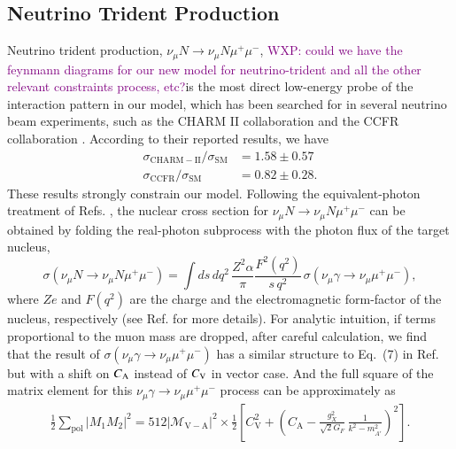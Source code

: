 \documentclass[onecolumn, aps, nofootinbib, prd, preprint, floats, floatfix, amsmath, amssymb, superscriptaddress, preprintnumbers]{revtex4-2}
\newcommand{\WXP}[1]{\textcolor{purple} {WXP: #1}}
\newcommand{\zb}[1]{{\color{blue} {#1}}}
\begin{document}
\subsection{Neutrino Trident Production}
Neutrino trident production, \zb{$\nu_\mu N\to \nu_\mu N\mu^+\mu^-$}, \WXP{could we have the feynmann diagrams for our new model for neutrino-trident and all the other relevant constraints process, etc?}is the most direct low-energy probe of the interaction pattern in our model, which has been searched for in several neutrino beam experiments, such as the CHARM II collaboration \cite{geiregat1990first} and the CCFR collaboration \cite{CCFR:1991lpl}. According to their reported results, we have 
\begin{equation}
\begin{aligned}
\sigma_{\mathrm{CHARM}-\mathrm{II}} / \sigma_{\mathrm{SM}} & =1.58 \pm 0.57 \\
\sigma_{\mathrm{CCFR}} / \sigma_{\mathrm{SM}} & =0.82 \pm 0.28.
\end{aligned}
\end{equation}
These results strongly constrain our model.
Following the equivalent-photon treatment of Refs. \cite{Williams:1934ad,Belusevic:1987cw,Altmannshofer:2014pba}, the nuclear cross section for $\nu_\mu N\to \nu_\mu N\mu^+\mu^-$ can be obtained by folding the real-photon subprocess with the photon flux of the target nucleus,
\begin{equation}
\sigma(\nu_\mu N\to\nu_\mu N\mu^+\mu^-)
=\int ds\,dq^2\,
\frac{Z^2\alpha}{\pi}\frac{F^2(q^2)}{s\,q^2}\,
\sigma(\nu_\mu\gamma\to\nu_\mu\mu^+\mu^-),
\label{eq:trident-epa}
\end{equation}
where $Ze$ and $F(q^2)$ are the charge and the electromagnetic form-factor of the nucleus, respectively (see Ref. \cite{Altmannshofer:2014pba} for more details).
For analytic intuition, if terms proportional to the muon mass are dropped, after careful calculation, we find that the result of $\sigma(\nu_\mu\gamma\to\nu_\mu\mu^+\mu^-)$ has a similar structure to Eq.~(7) in Ref.~\cite{Altmannshofer:2014pba} but with a shift on $C_{\rm A}$ instead of $C_{\rm V}$ in vector case.
And the full square of the matrix element for this $\nu_\mu\gamma\to\nu_\mu\mu^+\mu^-$ process can be approximately as
\begin{equation}
\begin{aligned}
\frac{1}{2} \sum_{\mathrm{pol}}\left|M_1 M_2\right|^2=512\left|\mathcal{M}_{\mathrm{V}-\mathrm{A}}\right|^2 \times \frac{1}{2}\left[C_{\mathrm{V}}^2+\left(C_{\mathrm{A}}-\frac{g_X^2}{\sqrt2G_F}\,
\frac{1}{k^2-m_{A'}^2}\right)^2 \right].
\end{aligned}
\end{equation}
\end{document}
